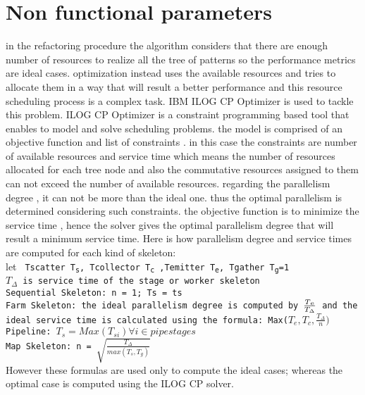 \documentclass[12pt]{report}
\begin{document}
\section{Non functional parameters}
in the refactoring procedure the algorithm considers that there are enough number of resources to realize all the tree of patterns so the performance metrics are ideal cases. optimization instead uses the available resources and tries to allocate them in a way that will result a better performance and this resource scheduling process is a complex task. IBM ILOG CP Optimizer is used to tackle this problem. ILOG CP Optimizer is a constraint programming based tool that enables to model and solve scheduling problems. 
the model is comprised of an objective function and list of constraints . in this case the constraints are number of available resources and service time which means the number of resources allocated for each tree node and also the commutative resources assigned to them can not exceed the number of available resources. regarding the parallelism degree , it can not be more than the ideal one. thus the optimal parallelism is determined considering such constraints. the objective function is to minimize the service time , hence the solver gives the optimal parallelism degree that will result a minimum service time.
Here is how  parallelism degree and service times are computed for each kind of skeleton:
\\
	let \texttt{ Tscatter 	T\textsubscript{s}, 					Tcollector T\textsubscript{c} ,Temitter T\textsubscript{e}, Tgather T\textsubscript{g}=1\\
	$T_{\Delta}$ is service time of the stage or worker skeleton\\
	Sequential Skeleton:	n = 1; Ts = ts\\
	Farm Skeleton:	the ideal parallelism degree is computed by $\frac{T\textsubscript{e}}{T_{\Delta}}$ and the ideal service time is calculated using the formula:  {Max($T_e,T_c,\frac{T_\Delta}{n})$}\\
	 Pipeline: {$T_s = Max(T_{si}) \forall i \in pipe stages$} \\
     Map Skeleton:  n = $\sqrt{\frac{T_{\Delta}}{max(T_s, T_g)}}$}\\	
	 
However these formulas are used only to compute the ideal cases; whereas the optimal case is computed using the ILOG CP solver. 
\end{document}

